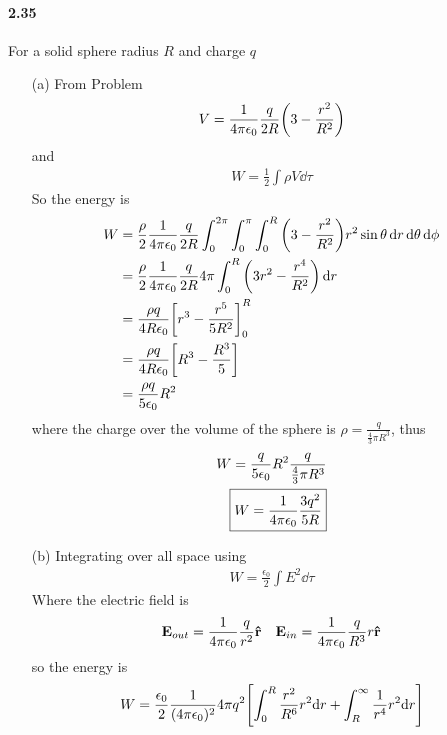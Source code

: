 \documentclass[../main.tex]{subfiles}
\begin{document}
\paragraph{2.35} For a solid sphere radius $R$ and charge $q$
\begin{itemize}
    \item [(a)] From Problem 
    \begin{align*}
        V = \ke \frac{q}{2R} \qt(3 - \frac{r^2}{R^2}) 
    \end{align*} and
    \begin{align*} \tag{2.43} \label{eq:2_43}
        W = \frac{1}{2} \int \rho V \dd{\tau}
    \end{align*}
    So the energy is 
    \begin{align*}
        W &= \frac{\rho}{2} \ke \frac{q}{2R} \int_0^{2\pi}\int_0^\pi\int_0^R \qt(3 - \frac{r^2}{R^2}) r^2 \sin\theta \dd{r} \dd{\theta} \dd{\phi} \\
        &= \frac{\rho}{2} \ke \frac{q}{2R} 4\pi \int_0^R \qt(3r^2 - \frac{r^4}{R^2}) \dd{r} \\
        &= \frac{\rho q}{4R\epsilon_0} \qt[r^3 - \frac{r^5}{5R^2}]_0^R \\
        &= \frac{\rho q}{4R\epsilon_0} \qt[R^3 - \frac{R^3}{5}] \\
        &= \frac{\rho q}{5\epsilon_0} R^2
    \end{align*}
    where the charge over the volume of the sphere is $\rho = \frac{q}{\frac{4}{3}\pi R^3}$, thus
    \begin{align*}
        W = \frac{q}{5\epsilon_0} R^2 \frac{q}{\frac{4}{3}\pi R^3} \\
        \boxed{W = \frac{1}{4\pi\epsilon_0} \frac{3q^2}{5R}}
    \end{align*}
    \item[(b)] Integrating over all space using 
    \begin{align*}\tag{2.45} \label{eq:2_45}
        W = \frac{\epsilon_0}{2} \int E^2 \dd{\tau}
    \end{align*}
    Where the electric field is
    \begin{align*}
        \vb{E}_{out} = \frac{1}{4\pi\epsilon_0} \frac{q}{r^2} \vu{r} \quad \vb{E}_{in} = \frac{1}{4\pi\epsilon_0} \frac{q}{R^3} r \vu{r}
    \end{align*}
    so the energy is
    \begin{align*}
        W &= \frac{\epsilon_0}{2} \frac{1}{(4\pi\epsilon_0)^2} 4\pi q^2 \qt[\int_0^R \frac{r^2}{R^6} r^2 \dd r + \int_R^\infty \frac{1}{r^4} r^2 \dd r] \\

\end{align*}
\end{itemize}
\end{document}
